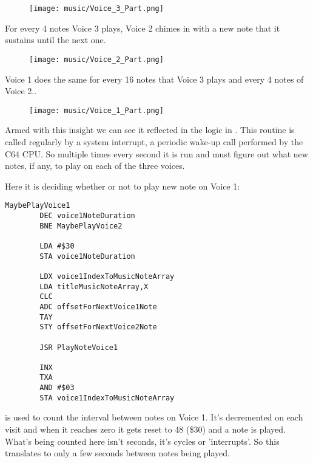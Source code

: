 \begin{figure}[H]
{
  \begin{adjustbox}{width=11cm,center}
  \texttt{[image: music/Voice\_3\_Part.png]}%
    \end{adjustbox}
}
\end{figure}

For every 4 notes Voice 3 plays, Voice 2 chimes in with a new note that it sustains until the next one.

\begin{figure}[H]
{
  \begin{adjustbox}{width=11cm,center}
  \texttt{[image: music/Voice\_2\_Part.png]}%
    \end{adjustbox}
}
\end{figure}

Voice 1 does the same for every 16 notes that Voice 3 plays and every 4 notes of Voice 2..

\begin{figure}[H]
{
  \begin{adjustbox}{width=11cm,center}
  \texttt{[image: music/Voice\_1\_Part.png]}%
    \end{adjustbox}
}
\end{figure}

Armed with this insight we can see it reflected in the logic in . This routine
is called regularly by a system interrupt, a periodic wake-up call performed by the C64 CPU. So multiple
times every second it is run and must figure out what new notes, if any, to play on each of the three
voices.

Here it is deciding whether or not to play new note on Voice 1:

\begin{lstlisting}[caption=\icode{MaybePlayVoice1}\, part of \icode{PlayTitleScreenMusic}.,basicstyle=\tiny]
MaybePlayVoice1   
        DEC voice1NoteDuration
        BNE MaybePlayVoice2

        LDA #$30
        STA voice1NoteDuration

        LDX voice1IndexToMusicNoteArray
        LDA titleMusicNoteArray,X
        CLC
        ADC offsetForNextVoice1Note
        TAY
        STY offsetForNextVoice2Note

        JSR PlayNoteVoice1

        INX
        TXA
        AND #$03
        STA voice1IndexToMusicNoteArray
\end{lstlisting}
 is used to count the interval between notes on Voice 1. It's decremented on each
visit and when it reaches zero it gets reset to 48 (\$30) and a note is played. What's being counted here isn't
seconds, it's cycles or 'interrupts'. So this translates to only a few seconds between notes being played.

